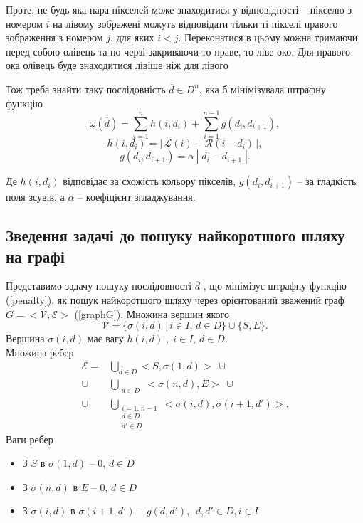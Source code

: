 \documentclass{ConfFTI}
\begin{document}
Проте, не будь яка пара пікселей може знаходитися у відповідності -- пікселю з номером $i$ на лівому зображені можуть відповідати тільки ті пікселі  правого зображення з номером $j$, для яких $i < j$. Переконатися в цьому можна тримаючи перед собою олівець та по черзі закриваючи то праве, то ліве око. Для правого ока олівець буде знаходитися лівіше ніж для лівого

Тож треба знайти таку послідовність $\overline{d} \in {D}^n$, яка б мінімізувала штрафну функцію
\begin{equation}
\omega(\overline{d}) = \sum\limits_{i = 1}^n h(i, d_i) + \sum\limits_{i = 1}^{n-1} g(d_i, d_{i + 1}),
\label{penalty}
\end{equation}
$$ h(i, d_i) = | \, \mathcal{L} (i) - \mathcal{R} (i - d_i) \, |, $$ 
$$ g(d_i, d_{i+1}) = \alpha \, | \; d_i - d_{i+1}\; |. $$

Де $ h(i, d_i) $ відповідає за схожість кольору пікселів, $ g(d_i, d_{i+1}) $ -- за гладкість поля зсувів, а $ \alpha $ -- коефіцієнт згладжування.


\subsection{Зведення задачі до пошуку найкоротшого  шляху на графі} 
Представимо задачу пошуку послідовності $ \overline{d} $ , що мінімізує штрафну функцію (\ref{penalty}), як пошук найкоротшого шляху через орієнтований зважений граф $G = <\mathcal{V}, \mathcal{E}>$ (\ref{graphG}). Множина вершин якого
$$ \mathcal{V} = \{ \sigma(i, d) \, | \, i \in I, \, d \in D \} \cup \{ S, E \}.$$ Вершина $\sigma(i, d)$ має вагу $h(i, d) \;, \; i \in I, \, d \in D .$\\
Множина ребер
\begin{align*}
\mathcal{E} = &\bigcup\limits_{d \in D }<S, \sigma(1, d) > \; \cup 
\\ \cup &\bigcup\limits_{\substack{d \in D}} <\sigma(n, d), E > \; \cup 
\\ \cup &\bigcup\limits_{\substack{i = 1..n-1 \\d \in D \\d' \in D}} <\sigma(i, d), \sigma(i+1, d') >.
\end{align*}
Ваги ребер
\begin{itemize}
\item З $ S $ в $ \sigma(1, d) $ -- $ 0 $, $ d \in D $
\item З $ \sigma(n, d) $ в $ E $ -- $ 0 $, $ d \in D $
\item З $ \sigma(i, d) $ в $\sigma(i + 1, d ') $ -- $ g(d, d') $, $ \; d, d' \in D, i \in I $
\end{itemize}
\end{document}
